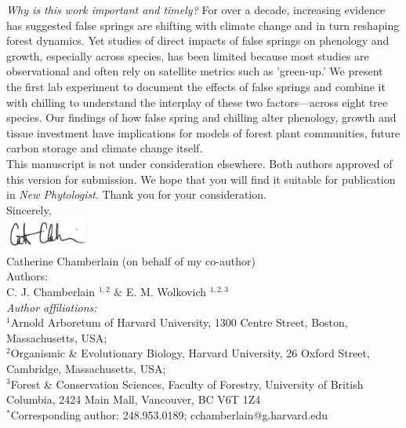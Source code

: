 \documentclass[11pt,a4paper]{article}\usepackage[]{graphicx}\usepackage[]{color}
\begin{document}
\noindent \textit{Why is this work important and timely?} For over a decade, increasing evidence has suggested false springs are shifting with climate change and in turn reshaping forest dynamics. Yet studies of direct impacts of false springs on phenology and growth, especially across species, has been limited because most studies are observational and often rely on satellite metrics such as 'green-up.' We present the first lab experiment to document the effects of false springs and combine it with chilling to understand the interplay of these two factors---across eight tree species. Our findings of how false spring and chilling alter phenology, growth and tissue investment have implications for models of forest plant communities, future carbon storage and climate change itself. \\

\noindent This manuscript is not under consideration elsewhere. Both authors approved of this version for submission. We hope that you will find it suitable for publication in \textit{New Phytologist}. Thank you for your consideration. \\

\vspace{1.5ex}
\noindent Sincerely, \\
\includegraphics[width=0.2\textwidth]{full_signature.jpg} \\
\noindent Catherine Chamberlain (on behalf of my co-author)
\vspace{2ex}\\
\noindent Authors:\\
C. J. Chamberlain $^{1,2}$ \& E. M. Wolkovich $^{1,2,3}$
\vspace{2ex}\\
\emph{Author affiliations:}\\
$^{1}$Arnold Arboretum of Harvard University, 1300 Centre Street, Boston, Massachusetts, USA; \\
$^{2}$Organismic \& Evolutionary Biology, Harvard University, 26 Oxford Street, Cambridge, Massachusetts, USA; \\
$^{3}$Forest \& Conservation Sciences, Faculty of Forestry, University of British Columbia, 2424 Main Mall, Vancouver, BC V6T 1Z4\\
\vspace{2ex}
$^*$Corresponding author: 248.953.0189; cchamberlain@g.harvard.edu\\

%
\end{document}
